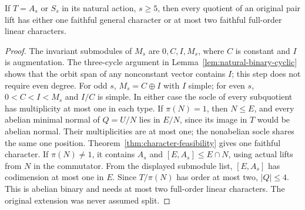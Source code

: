 \begin{lemma}
\label{lem:natural-pair-top}
If $T=A_s$ or $S_s$ in its natural action, $s\geq5$, then every
quotient of an original pair lift has either one faithful general
character or at most two faithful full-order linear characters.
\end{lemma}
\begin{proof}
The invariant submodules of $M_s$ are $0,C,I,M_s$, where $C$ is
constant and $I$ is augmentation. The three-cycle argument in
Lemma~\ref{lem:natural-binary-cyclic} shows that the orbit span of
any nonconstant vector contains $I$; this step does not require
even degree. For odd $s$, $M_s=C\oplus I$ with $I$ simple;
for even $s$, $0<C<I<M_s$ and $I/C$ is simple. In either case the
socle of every subquotient has multiplicity at most one in each type.
If $\pi(N)=1$, then $N\leq E$, and every abelian minimal normal of
$Q=U/N$ lies in $E/N$, since its image in $T$ would be abelian normal.
Their multiplicities are at most one; the nonabelian socle shares the
same one position. Theorem~\ref{thm:character-feasibility} gives one
faithful character. If $\pi(N)\ne1$, it contains $A_s$ and
$[E,A_s]\leq E\cap N$, using actual lifts from $N$ in the commutator.
From the displayed submodule list, $[E,A_s]$ has codimension at most
one in $E$. Since $T/\pi(N)$ has order at most two, $|Q|\leq4$.
This is abelian binary and needs at most two full-order linear
characters. The original extension was never assumed split.
\end{proof}


